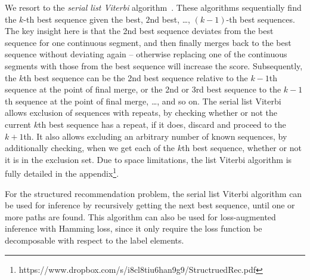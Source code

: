 We resort to the \emph{serial list Viterbi} algorithm~\cite{nilsson2001sequentially}.
These algorithms sequentially find the $k$-th best sequence given the best, $2$nd best, \dots, $(k-1)$-th best sequences.
The key insight here is that the 2nd best sequence deviates from the best sequence
for one continuous segment, and then finally merges back to the best sequence without deviating again
-- otherwise replacing one of the continuous segments with those from the best sequence will increase the score.
Subsequently, the $k$th best sequence can be the 2nd best sequence relative to the $k-1$th sequence
at the point of final merge, or the 2nd or 3rd best sequence to the $k-1$th sequence at the point of final merge, \ldots, and so on.
The serial list Viterbi allows exclusion of sequences with repeats, by checking whether or not the current $k$th best sequence has a repeat, if it does, discard and proceed to the $k+1$th. It also allows excluding an arbitrary number of known sequences, by additionally checking, when we get each of the $k$th best sequence, whether or not it is in the exclusion set.
Due to space limitations, the list Viterbi algorithm is fully detailed in the appendix\footnote{https://www.dropbox.com/s/i8cl8tiu6han9g9/StructruedRec.pdf}.

For the structured recommendation problem, the serial list Viterbi algorithm can be used for inference
by recursively getting the next best sequence, until one or more paths are found.
This algorithm can also be used for loss-augmented inference with Hamming loss,
since it only require the loss function be decomposable with respect to the label elements.

